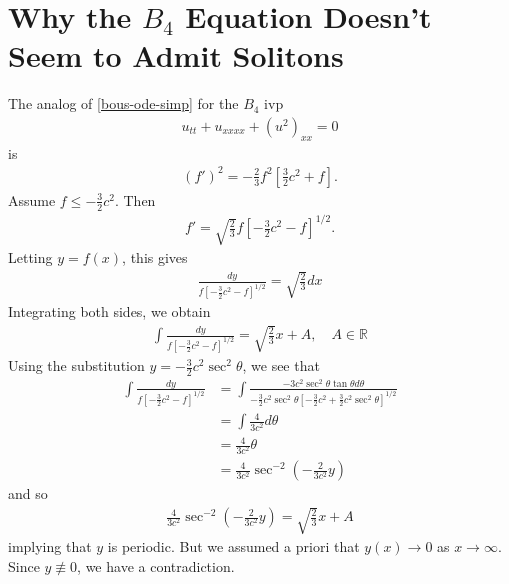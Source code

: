 \documentclass[12pt,reqno]{amsart}
\numberwithin{equation}{section}  %
\newcommand{\rr}{\mathbb{R}}
\begin{document}
\section{Why the $B_{4}$ Equation Doesn't Seem to Admit Solitons} 
\label{sec:B4-soliton-fail}
%
%
The analog of \eqref{bous-ode-simp} for the $B_{4}$ ivp
\begin{equation}
  \label{b4}
\begin{split}
  u_{tt} + u_{xxxx} + (u^{2})_{xx} = 0
\end{split}
\end{equation}
is
\begin{equation}
  \label{b4-ode-simp}
\begin{split}
  (f')^{2} = -\frac{2}{3} f^{2} \left [ \frac{3}{2}c^{2} +f \right ]. 
\end{split}
\end{equation}
Assume $f \le -\frac{3}{2}c^{2}$. Then 
%
\begin{equation*}
\begin{split}
  f' = \sqrt{\frac{2}{3}}f \left[ -\frac{3}{2}c^{2} -f \right]^{1/2}.
\end{split}
\end{equation*}
%
%
Letting $y = f(x)$, this gives
%
%
\begin{equation*}
\begin{split}
\frac{dy}{ f \left[ -\frac{3}{2}c^{2} -f \right]^{1/2}} = \sqrt{\frac{2}{3}}
dx
\end{split}
\end{equation*}
%
Integrating both sides, we obtain
%
%
%
%
\begin{equation*}
\begin{split}
\int \frac{dy}{ f \left[ -\frac{3}{2}c^{2} -f \right]^{1/2}} = \sqrt{\frac{2}{3}}
x + A, \quad A \in \rr
\end{split}
\end{equation*}
%
%
Using the substitution $y = -\frac{3}{2}c^{2}\sec^{2} \theta$, we see that
%
%
\begin{equation*}
\begin{split}
\int \frac{dy}{ f \left[ -\frac{3}{2}c^{2} -f \right]^{1/2}} 
& = \int \frac{-3 c^{2} \sec^{2}\theta \tan \theta d
\theta}{-\frac{3}{2}c^{2} \sec^{2} \theta \left[ -\frac{3}{2}c^{2} +
\frac{3}{2}c^{2} \sec^{2} \theta \right]^{1/2}}
\\
& = \int \frac{4}{3c^{2}} d \theta
\\
& = \frac{4}{3c^{2}} \theta
\\
& = \frac{4}{3c^{2}} \sec^{-2}\left (-\frac{2}{3c^{2}}y \right )
\end{split}
\end{equation*}
%
%
and so
%
%
\begin{equation*}
\begin{split}
 \frac{4}{3c^{2}} \sec^{-2}\left (-\frac{2}{3c^{2}}y \right )
= \sqrt{\frac{2}{3}}
x + A
\end{split}
\end{equation*}
%
%
implying that $y$ is periodic. But we assumed a priori that $y(x) \to 0$ as $x
\to \infty$. Since $y \not \equiv 0$, we have a contradiction.
\end{document}
